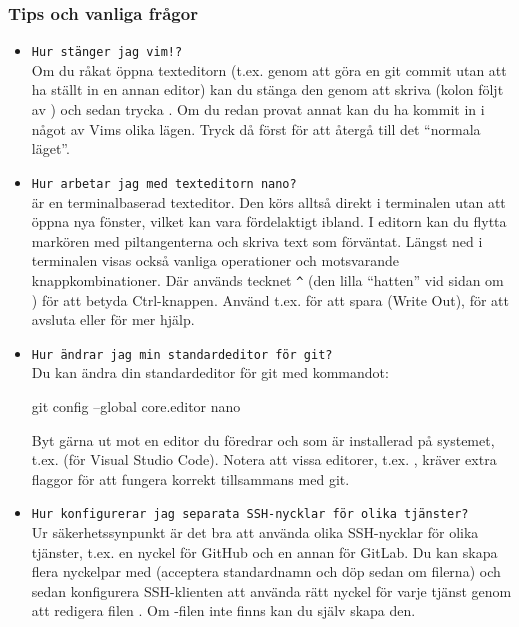 \subsubsection{Tips och vanliga frågor}
\begin{itemize}[nosep]

    \item \texttt{Hur stänger jag vim!?}\\
          Om du råkat öppna texteditorn  (t.ex. genom att göra en git commit utan att ha ställt in en annan editor) kan du stänga den genom att skriva  (kolon följt av ) och sedan trycka . Om du redan provat annat kan du ha kommit in i något av Vims olika lägen. Tryck då först  för att återgå till det \enquote{normala läget}.

    \item \texttt{Hur arbetar jag med texteditorn nano?} \\
           är en terminalbaserad texteditor. Den körs alltså direkt i terminalen utan att öppna nya fönster, vilket kan vara fördelaktigt ibland. I editorn kan du flytta markören med piltangenterna och skriva text som förväntat. Längst ned i terminalen visas också vanliga operationer och motsvarande knappkombinationer. Där används tecknet \texttt{\^{}} (den lilla \enquote{hatten} vid sidan om ) för att betyda Ctrl-knappen. Använd t.ex.  för att spara (Write Out),  för att avsluta eller  för mer hjälp.

    \item \texttt{Hur ändrar jag min standardeditor för git?}\\
          Du kan ändra din standardeditor för git med kommandot:
\begin{Code}
git config --global core.editor nano
\end{Code}
          Byt gärna ut  mot en editor du föredrar och som är installerad på systemet, t.ex.  (för Visual Studio Code). Notera att vissa editorer, t.ex. , kräver extra flaggor för att fungera korrekt tillsammans med git.

    \item \texttt{Hur konfigurerar jag separata SSH-nycklar för olika tjänster?}\\
          Ur säkerhetssynpunkt är det bra att använda olika SSH-nycklar för olika tjänster, t.ex. en nyckel för GitHub och en annan för GitLab. Du kan skapa flera nyckelpar med  (acceptera standardnamn och döp sedan om filerna) och sedan konfigurera SSH-klienten att använda rätt nyckel för varje tjänst genom att redigera filen . Om -filen inte finns kan du själv skapa den.


\end{itemize}
